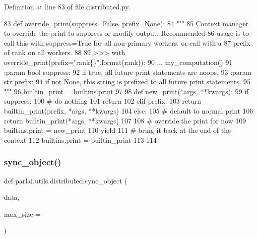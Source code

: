 Definition at line 83 of file distributed.\+py.


\begin{DoxyCode}
83 \textcolor{keyword}{def }\hyperlink{namespaceparlai_1_1utils_1_1distributed_a601345e55fc3fc3845c43efa1a04db56}{override\_print}(suppress=False, prefix=None):
84     \textcolor{stringliteral}{"""}
85 \textcolor{stringliteral}{    Context manager to override the print to suppress or modify output. Recommended}
86 \textcolor{stringliteral}{    usage is to call this with suppress=True for all non-primary workers, or call with a}
87 \textcolor{stringliteral}{    prefix of rank on all workers.}
88 \textcolor{stringliteral}{}
89 \textcolor{stringliteral}{    >>> with override\_print(prefix="rank\{\}".format(rank)):}
90 \textcolor{stringliteral}{    ...     my\_computation()}
91 \textcolor{stringliteral}{    :param bool suppress:}
92 \textcolor{stringliteral}{        if true, all future print statements are noops.}
93 \textcolor{stringliteral}{    :param str prefix:}
94 \textcolor{stringliteral}{        if not None, this string is prefixed to all future print statements.}
95 \textcolor{stringliteral}{    """}
96     builtin\_print = builtins.print
97 
98     \textcolor{keyword}{def }new\_print(*args, **kwargs):
99         \textcolor{keywordflow}{if} suppress:
100             \textcolor{comment}{# do nothing}
101             \textcolor{keywordflow}{return}
102         \textcolor{keywordflow}{elif} prefix:
103             \textcolor{keywordflow}{return} builtin\_print(prefix, *args, **kwargs)
104         \textcolor{keywordflow}{else}:
105             \textcolor{comment}{# default to normal print}
106             \textcolor{keywordflow}{return} builtin\_print(*args, **kwargs)
107 
108     \textcolor{comment}{# override the print for now}
109     builtins.print = new\_print
110     \textcolor{keywordflow}{yield}
111     \textcolor{comment}{# bring it back at the end of the context}
112     builtins.print = builtin\_print
113 
114 
\end{DoxyCode}
\mbox{\label{namespaceparlai_1_1utils_1_1distributed_a269d3c7284127d9b287b9b61e9161de6}} 
\subsubsection{\texorpdfstring{sync\+\_\+object()}{sync\_object()}}
{\footnotesize\ttfamily def parlai.\+utils.\+distributed.\+sync\+\_\+object (\begin{DoxyParamCaption}\item[{}]{data,  }\item[{}]{max\+\_\+size = {} }\end{DoxyParamCaption})}

